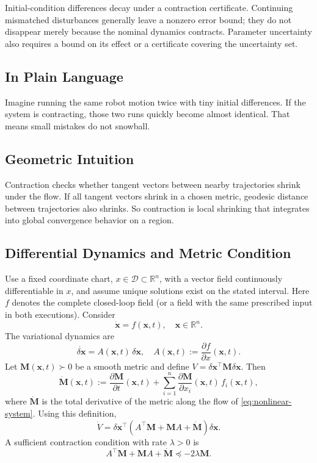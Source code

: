\documentclass[11pt,letterpaper]{article}
\newcommand{\R}{\mathbb{R}}
\newcommand{\M}{\mathbf{M}}
\newcommand{\x}{\mathbf{x}}
\newcommand{\dx}{\delta\mathbf{x}}
\begin{document}
Initial-condition differences decay under a contraction certificate. Continuing mismatched disturbances generally leave a nonzero error bound; they do not disappear merely because the nominal dynamics contracts. Parameter uncertainty also requires a bound on its effect or a certificate covering the uncertainty set.

\subsection{In Plain Language}
Imagine running the same robot motion twice with tiny initial differences. If the system is contracting, those two runs quickly become almost identical. That means small mistakes do not snowball.

\subsection{Geometric Intuition}
Contraction checks whether tangent vectors between nearby trajectories shrink under the flow. If all tangent vectors shrink in a chosen metric, geodesic distance between trajectories also shrinks. So contraction is local shrinking that integrates into global convergence behavior on a region.

\subsection{Differential Dynamics and Metric Condition}
Use a fixed coordinate chart, $x\in\mathcal D\subset\mathbb R^n$, with a vector field continuously differentiable in $x$, and assume unique solutions exist on the stated interval. Here $f$ denotes the complete closed-loop field (or a field with the same prescribed input in both executions). Consider
\begin{equation}
\dot{\x} = f(\x,t), \quad \x \in \R^n.
\label{eq:nonlinear-system}
\end{equation}
The variational dynamics are
\begin{equation}
\dot{\dx} = A(\x,t)\,\dx, \quad A(\x,t) := \frac{\partial f}{\partial x}(\x,t).
\label{eq:variational-dynamics}
\end{equation}
Let $\M(\x,t) \succ 0$ be a smooth metric and define $V = \dx^\top \M\dx$. Then
\begin{equation}
\dot{\M}(\x,t)
:= \frac{\partial \M}{\partial t}(\x,t)
 + \sum_{i=1}^{n}\frac{\partial \M}{\partial x_i}(\x,t)\,f_i(\x,t),
\label{eq:metric-total-derivative}
\end{equation}
where $\dot{\M}$ is the total derivative of the metric along the flow of \eqref{eq:nonlinear-system}. Using this definition,
\begin{equation}
\dot V = \dx^\top\!\left(A^\top\M + \M A + \dot{\M}\right)\!\dx.
\label{eq:metric-derivative}
\end{equation}
A sufficient contraction condition with rate $\lambda>0$ is
\begin{equation}
A^\top\M + \M A + \dot{\M} \preceq -2\lambda\M.
\label{eq:contraction-lmi}
\end{equation}
\end{document}
